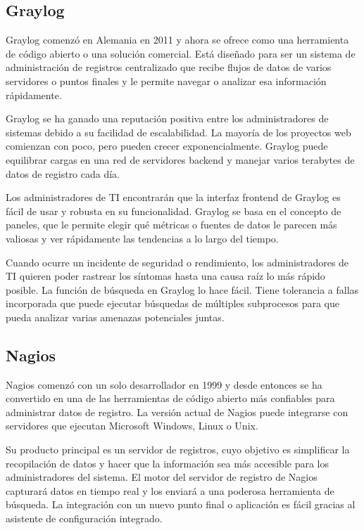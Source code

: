 \subsection{Graylog}

Graylog comenzó en Alemania en 2011 y ahora se ofrece como una herramienta de código abierto o una solución comercial. Está diseñado para ser un sistema de administración de registros centralizado que recibe flujos de datos de varios servidores o puntos finales y le permite navegar o analizar esa información rápidamente.

Graylog se ha ganado una reputación positiva entre los administradores de sistemas debido a su facilidad de escalabilidad. La mayoría de los proyectos web comienzan con poco, pero pueden crecer exponencialmente. Graylog puede equilibrar cargas en una red de servidores backend y manejar varios terabytes de datos de registro cada día.

Los administradores de TI encontrarán que la interfaz frontend de Graylog es fácil de usar y robusta en su funcionalidad. Graylog se basa en el concepto de paneles, que le permite elegir qué métricas o fuentes de datos le parecen más valiosas y ver rápidamente las tendencias a lo largo del tiempo.

Cuando ocurre un incidente de seguridad o rendimiento, los administradores de TI quieren poder rastrear los síntomas hasta una causa raíz lo más rápido posible. La función de búsqueda en Graylog lo hace fácil. Tiene tolerancia a fallas incorporada que puede ejecutar búsquedas de múltiples subprocesos para que pueda analizar varias amenazas potenciales juntas.

\subsection{Nagios}

Nagios comenzó con un solo desarrollador en 1999 y desde entonces se ha convertido en una de las herramientas de código abierto más confiables para administrar datos de registro. La versión actual de Nagios puede integrarse con servidores que ejecutan Microsoft Windows, Linux o Unix.

Su producto principal es un servidor de registros, cuyo objetivo es simplificar la recopilación de datos y hacer que la información sea más accesible para los administradores del sistema. El motor del servidor de registro de Nagios capturará datos en tiempo real y los enviará a una poderosa herramienta de búsqueda. La integración con un nuevo punto final o aplicación es fácil gracias al asistente de configuración integrado.

